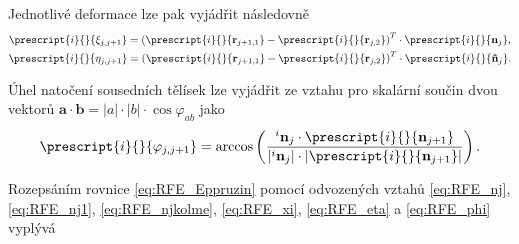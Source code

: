 Jednotlivé deformace lze pak vyjádřit následovně
\begin{gather}
	\prescript{i}{}{\xi_{j,j+1}} = \left( \prescript{i}{}{\mathbf{r}_{j+1,1}} - \prescript{i}{}{\mathbf{r}_{j,2}} \right)^T \cdot \prescript{i}{}{\mathbf{n}_j} \label{eq:RFE_xi},\\
	\prescript{i}{}{\eta_{j,j+1}} = \left( \prescript{i}{}{\mathbf{r}_{j+1,1}} - \prescript{i}{}{\mathbf{r}_{j,2}} \right)^T \cdot \prescript{i}{}{\mathbf{\hat{n}}_j} \label{eq:RFE_eta}.
\end{gather}

Úhel natočení sousedních tělísek lze vyjádřit ze vztahu pro skalární součin dvou vektorů $ \mathbf{a} \cdot \mathbf{b} = |a|\cdot|b|\cdot \cos \varphi_{ab}$ jako
\begin{equation}\label{eq:RFE_phi}
	\prescript{i}{}{\varphi_{j,j+1}} = \arccos \left( \frac{^i\mathbf{n}_j \cdot \prescript{i}{}{\mathbf{n}_{j+1}}}{|^i\mathbf{n}_j| \cdot |\prescript{i}{}{\mathbf{n}_{j+1}}|}		\right) .
\end{equation}

Rozepsáním rovnice \ref{eq:RFE_Eppruzin} pomocí odvozených vztahů \ref{eq:RFE_nj}, \ref{eq:RFE_nj1}, \ref{eq:RFE_njkolme}, \ref{eq:RFE_xi}, \ref{eq:RFE_eta} a \ref{eq:RFE_phi} vyplývá

